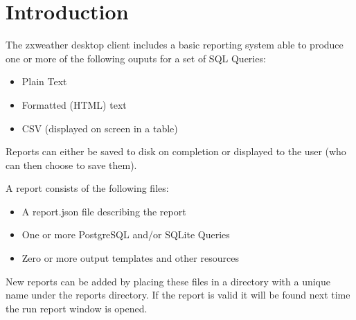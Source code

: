 \documentclass[a4paper,10pt]{book}
\newcommand{\partnumber}{\ifthenelse{\isundefined{\projectnum}}{}{\projectnum-\docnum	\ifthenelse{\equal{\docrev}{001}}{}{.\docrev}}}
\begin{document}

\ifthenelse{\isundefined{\ordernumber}}{

\title{\doctitle{} - \docsubtitle}
\author{\docauthor}
}{

\title{\doctitle}
\subtitle{\docsubtitle}
\titleabstract{\docabstract}
\ordernumber{\partnumber}
\updateinfo{\docupdateinfo}
\osinfo{\docosver}
\swversion{\docswver}
\titlecopyright{\doccopyright}
\licensestatement{\doclicense}
}
\date{\docdate}

\maketitle

\clearpage

\tableofcontents
\clearpage





\lstset{
  frame=single,
  numbers=left,
  basicstyle=\small,
  commentstyle=\emph
}



\chapter{Introduction}
\setcounter{page}{1}

The zxweather desktop client includes a basic reporting system able to produce one or more of the following ouputs for a set of SQL Queries:
\begin{itemize}
\item Plain Text
\item Formatted (HTML) text
\item CSV (displayed on screen in a table)
\end{itemize}
Reports can either be saved to disk on completion or displayed to the user (who can then choose to save them). 

A report consists of the following files:
\begin{itemize}
\item A report.json file describing the report
\item One or more PostgreSQL and/or SQLite Queries
\item Zero or more output templates and other resources
\end{itemize}
New reports can be added by placing these files in a directory with a unique name under the reports directory. If the report is valid it will be found next time the run report window is opened.
\end{document}
